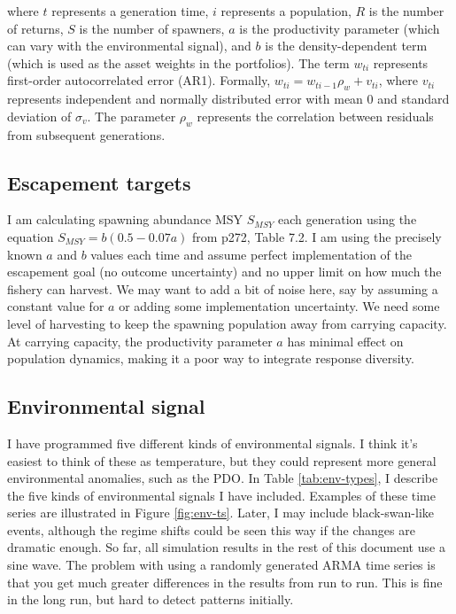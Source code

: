 \documentclass[12pt]{article}
\begin{document}
\noindent
where $t$ represents a generation time, $i$ represents a population, $R$
is the number of returns, $S$ is the number of spawners, $a$ is the
productivity parameter (which can vary with the environmental signal),
and $b$ is the density-dependent term (which is used as the asset
weights in the portfolios). The term $w_{ti}$ represents first-order
autocorrelated error (AR1). Formally,
$w_{ti} = w_{ti-1} \rho_w + v_{ti}$, where $v_{ti}$ represents
independent and normally distributed error with mean 0 and standard
deviation of $\sigma_v$. The parameter $\rho_w$ represents the
correlation between residuals from subsequent generations.

\subsection{Escapement targets}

I am calculating spawning abundance MSY $S_{MSY}$ each generation using
the equation $S_{MSY} = b(0.5-0.07a)$ from \citet{Hilborn1992} p272,
Table 7.2. I am using the precisely known $a$ and $b$ values each time
and assume perfect implementation of the escapement goal (no outcome
uncertainty) and no upper limit on how much the fishery can harvest. We
may want to add a bit of noise here, say by assuming a constant value
for $a$ or adding some implementation uncertainty. We need some level of
harvesting to keep the spawning population away from carrying capacity.
At carrying capacity, the productivity parameter $a$ has minimal effect
on population dynamics, making it a poor way to integrate response
diversity.

\subsection{Environmental signal}

I have programmed five different kinds of environmental signals. I think
it's easiest to think of these as temperature, but they could represent
more general environmental anomalies, such as the PDO. In Table
\ref{tab:env-types}, I describe the five kinds of environmental signals
I have included. Examples of these time series are illustrated in Figure
\ref{fig:env-ts}. Later, I may include black-swan-like events, although
the regime shifts could be seen this way if the changes are dramatic
enough. So far, all simulation results in the rest of this document use
a sine wave. The problem with using a randomly generated ARMA time
series is that you get much greater differences in the results from run
to run. This is fine in the long run, but hard to detect patterns
initially.
\end{document}
